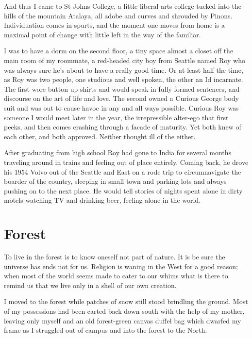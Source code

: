 \documentclass[ebook, 10pt, openright, onecolumn]{memoir}
\newcommand*\td[1]{
  \todo[inline]{
     #1 
  }
}
\newcommand*\finish{\td{ ----- Finish this section -----}}
\begin{document}
And thus I came to St Johns College, a little liberal arts college tucked into
the hills of the mountain Atalaya, all adobe and curves and shrouded by Pinons.
Individuation comes in spurts, and the moment one moves from home is a maximal
point of change with little left in the way of the familiar.

I was to have a dorm on the second floor, a tiny space almost a closet off the
main room of my roommate, a red-headed city boy from Seattle named Roy who was
always sure he's about to have a really good time.  Or at least half the time,
as Roy was two people, one studious and well spoken, the other an Id incarnate.
The first wore button up shirts and would speak in fully formed sentences, and
discourse on the art of life and love.  The second owned a Curious George body
suit and was out to cause havoc in any and all ways possible.  Curious Roy was
someone I would meet later in the year, the irrepressible alter-ego that first
peeks, and then comes crashing through a facade of maturity.  Yet both knew of
each other, and both approved.  Neither thought ill of the either.

After graduating from high school Roy had gone to India for several months
traveling around in trains and feeling out of place entirely.  Coming back, he
drove his 1954 Volvo out of the Seattle and East on a rode trip to
circumnavigate the boarder of the country, sleeping in small town and parking
lots and always pushing on to the next place.  He would tell stories of nights
spent alone in dirty motels watching TV and drinking beer, feeling alone in the
world.  

\finish

\chapter{Forest}
\label{cha:forest}

To live in the forest is to know oneself not part of nature.  It is be sure the
universe has ends not for us.  Religion is waning in the West for a good
reason; when most of the world seems made to cater to our whims what is there to
remind us that we live only in a shell of our own creation.

I moved to the forest while patches of snow still stood brindling the
ground. Most of my possessions had been carted back down south with the help of
my mother, leaving only myself and an old forest-green canvas duffel bag which
dwarfed my frame as I struggled out of campus and into the forest to the North.
\end{document}
